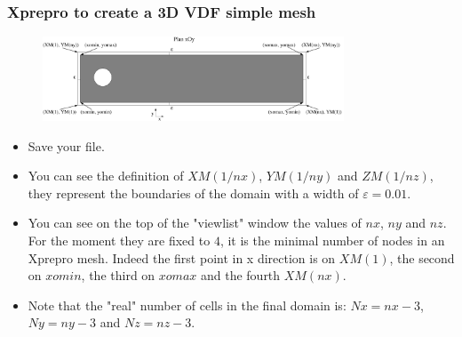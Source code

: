 \documentclass[10pt, hyperref={unicode=true,pdfusetitle, bookmarks=true,bookmarksnumbered=false,bookmarksopen=false, breaklinks=false,pdfborder={0 0 1},backref=true,colorlinks=true,linkcolor=darkblue,pageanchor}]{beamer}
\begin{document}
\begin{frame}
\frametitle{Xprepro to create a 3D VDF simple mesh}
\begin{block}{}

\begin{figure}
\includegraphics[width=0.8\textwidth]{PICTURES/xprepro1.pdf}
\end{figure}

\begin{itemize}
\item Save your file.
\item You can see the definition of $XM(1/nx)$, $YM(1/ny)$ and $ZM(1/nz)$, they represent the boundaries of the domain with a width of $\varepsilon=0.01$.
\item You can see on the top of the "viewlist" window the values of $nx$, $ny$ and $nz$. For the moment they are fixed to $4$, it is the minimal number of nodes in an Xprepro mesh. Indeed the first point in x direction is on $XM(1)$, the second on $xomin$, the third on $xomax$ and the fourth $XM(nx)$.
\item Note that the "real" number of cells in the final domain is: $Nx=nx-3$, $Ny=ny-3$ and $Nz=nz-3$.
\end{itemize}

\end{block}
\end{frame}
\end{document}
